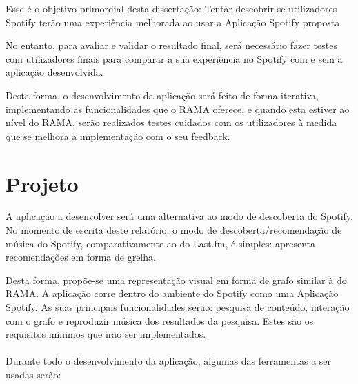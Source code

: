 Esse é o objetivo primordial desta dissertação: Tentar descobrir se utilizadores Spotify terão uma experiência melhorada ao usar a Aplicação Spotify proposta.

No entanto, para avaliar e validar o resultado final, será necessário fazer testes com utilizadores finais para comparar a sua experiência no Spotify com e sem a aplicação desenvolvida.

Desta forma, o desenvolvimento da aplicação será feito de forma iterativa, implementando as funcionalidades que o RAMA oferece, e quando esta estiver ao nível do RAMA, serão realizados testes cuidados com os utilizadores à medida que se melhora a implementação com o seu feedback.

\section{Projeto} \label{sec:proj}

A aplicação a desenvolver será uma alternativa ao modo de descoberta do Spotify.
No momento de escrita deste relatório, o modo de descoberta/recomendação de música do Spotify, comparativamente ao do Last.fm, é simples: apresenta recomendações em forma de grelha.

Desta forma, propõe-se uma representação visual em forma de grafo similar à do RAMA.
A aplicação corre dentro do ambiente do Spotify como uma Aplicação Spotify.
As suas principais funcionalidades serão: pesquisa de conteúdo, interação com o grafo e reproduzir música dos resultados da pesquisa.
Estes são os requisitos mínimos que irão ser implementados.
\\
\\
Durante todo o desenvolvimento da aplicação, algumas das ferramentas a ser usadas serão:

